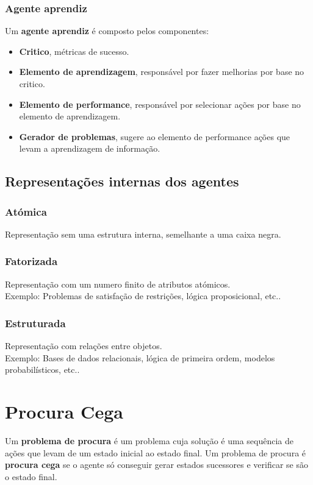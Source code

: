 \documentclass[]{report}
\begin{document}
\subsection{Agente aprendiz}
Um \textbf{agente aprendiz} é composto pelos componentes:
\begin{itemize}
	\item \textbf{Critico}, métricas de sucesso.
	\item \textbf{Elemento de aprendizagem}, responsável por fazer melhorias por base no critico.
	\item \textbf{Elemento de performance}, responsável por selecionar ações por base no elemento de aprendizagem.
	\item \textbf{Gerador de problemas}, sugere ao elemento de performance ações que levam a aprendizagem de informação.
\end{itemize}
\section{Representações internas dos agentes}
\subsection{Atómica}
Representação sem uma estrutura interna, semelhante a uma caixa negra.
\subsection{Fatorizada}
Representação com um numero finito de atributos atómicos.\\
Exemplo: Problemas de satisfação de restrições, lógica proposicional, etc..
\subsection{Estruturada}
Representação com relações entre objetos.\\
Exemplo: Bases de dados relacionais, lógica de primeira ordem, modelos probabilísticos, etc..
\chapter{Procura Cega}
Um \textbf{problema de procura} é um problema cuja solução é uma sequência de ações que levam de um estado inicial ao estado final. Um problema de procura é \textbf{procura cega} se o agente só conseguir gerar estados sucessores e verificar se são o estado final.
\end{document}
